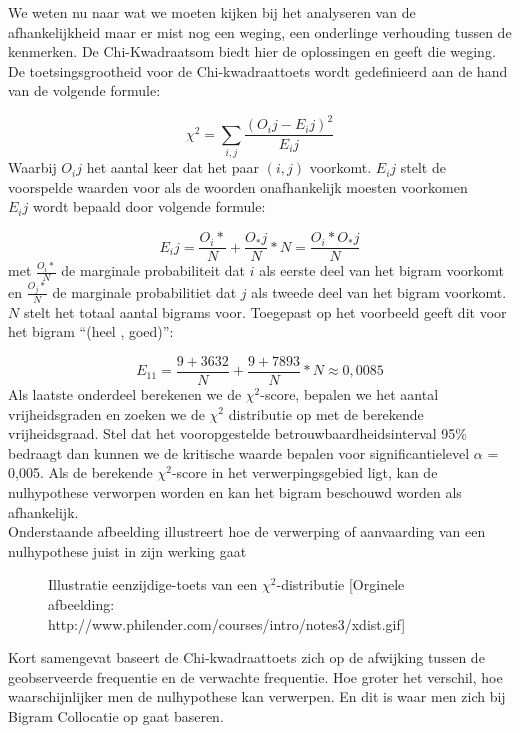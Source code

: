 \newline
We weten nu naar wat we moeten kijken bij het analyseren van de afhankelijkheid maar er mist nog een weging, een onderlinge verhouding tussen de kenmerken. 
%
De Chi-Kwadraatsom biedt hier de oplossingen en geeft die weging. De toetsingsgrootheid voor de Chi-kwadraattoets wordt gedefinieerd aan de hand van de volgende formule:

\[{\chi}^2=\sum_{i,j}^{} \frac{(O_ij - E_ij)^2}{E_ij}\]
%
Waarbij ${O_ij}$ het aantal keer dat het paar $(i,j)$ voorkomt. $E_ij$ stelt de voorspelde waarden voor als de woorden onafhankelijk moesten voorkomen\\
$E_ij$ wordt bepaald door volgende formule:

\[{E_ij}= \frac{O_i*}{N} + \frac{O_*j}{N} * N = \frac{O_i* O_*j}{N} \]
%
met $\frac{O_i*}{N}$ de marginale probabiliteit dat $i$ als eerste deel van het bigram voorkomt en $\frac{O_j*}{N}$ de marginale probabilitiet dat $j$ als tweede deel van het bigram voorkomt. $N$ stelt het totaal aantal bigrams voor.
%
Toegepast op het voorbeeld geeft dit voor het bigram ``(heel , goed)'':

\[{E_11} = \frac{9+3632}{N}+\frac{9+7893}{N} * N \approx 0,0085 \]
\newline
Als laatste onderdeel berekenen we de ${\chi}^2$-score, bepalen we het aantal vrijheidsgraden en zoeken we de ${\chi}^2$ distributie op met de berekende vrijheidsgraad. Stel dat het vooropgestelde betrouwbaardheidsinterval 95\% bedraagt dan kunnen we de kritische waarde bepalen voor significantielevel $\alpha$ = 0,005.
Als de berekende ${\chi}^2$-score in het verwerpingsgebied ligt, kan de nulhypothese verworpen worden en kan het bigram beschouwd worden als afhankelijk.\\
%
Onderstaande afbeelding illustreert hoe de verwerping of aanvaarding van een nulhypothese juist in zijn werking gaat
%
\begin{figure}[h]%
    \centering
    \caption{Illustratie eenzijdige-toets van een ${\chi}^2$-distributie [Orginele afbeelding: http://www.philender.com/courses/intro/notes3/xdist.gif]}%
\end{figure}
\newline
Kort samengevat baseert de Chi-kwadraattoets zich op de afwijking tussen de geobserveerde frequentie en de verwachte frequentie. Hoe groter het verschil, hoe waarschijnlijker men de nulhypothese kan verwerpen. En dit is waar men zich bij Bigram Collocatie op gaat baseren.

